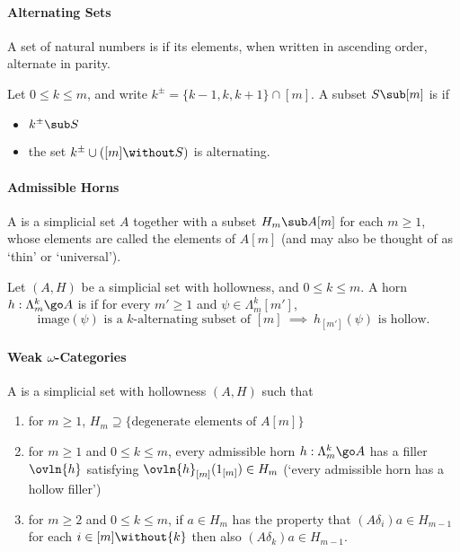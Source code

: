 
\paragraph{Alternating Sets} 

A set of natural numbers is  if its elements,
when written in ascending order, alternate in parity.

Let $0\leq k\leq m$, and write $k^\pm = \{k-1,k,k+1\} \cap [m]$.  A subset $S
\sub [m]$ is  if
%
\begin{itemize}
\item $k^\pm \sub S$
\item the set $k^\pm \cup ([m] \without S)$ is alternating.
\end{itemize}

\paragraph{Admissible Horns}

A  is a simplicial set $A$ together
with a subset $H_m\sub A[m]$ for each $m\geq 1$, whose elements are called
the  elements of $A[m]$ (and may also be thought of as `thin'
or `universal').

Let $(A,H)$ be a simplicial set with hollowness, and $0\leq k\leq m$.  A horn
$h: \Lambda^k_m \go A$ is  if for every $m'\geq 1$ and
$\psi\in\Lambda^k_m[m']$,
\[
\textrm{image}(\psi) \textrm{ is a } k\textrm{-alternating subset of }[m]
\ \implies\ 
h_{[m']}(\psi) \textrm{ is hollow.}	
\]




\paragraph{Weak $\omega$-Categories}

A  is a simplicial set with hollowness $(A,H)$
such that
%
\begin{enumerate}
\item  	\label{part:degen} 
for $m\geq 1$, $H_m \supseteq \{ \textrm{degenerate elements of }
A[m] \}$
\item 	\label{part:filler}
for $m\geq 1$ and $0\leq k\leq m$, every admissible horn $h:
\Lambda^k_m \go A$ has a filler $\ovln{h}$ satisfying $\ovln{h}_{[m]}(1_{[m]})
\in H_m$ (`every admissible horn has a hollow filler')
\item  	\label{part:comp}
for $m\geq 2$ and $0\leq k\leq m$, if $a\in H_m$ has the property that
$(A\delta_i)a \in H_{m-1}$ for each $i \in [m]\without \{k\}$ then also
$(A\delta_k)a \in H_{m-1}$. 
\end{enumerate}


